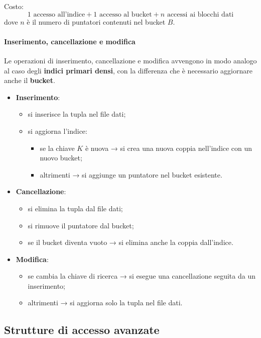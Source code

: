 Costo:
\[
1 \text{ accesso all'indice} + 1 \text{ accesso al bucket} + n \text{ accessi ai blocchi dati}
\]
dove $n$ è il numero di puntatori contenuti nel bucket $B$.

\paragraph{Inserimento, cancellazione e modifica}

Le operazioni di inserimento, cancellazione e modifica avvengono in modo analogo al caso degli \textbf{indici primari densi}, con la differenza che è necessario aggiornare anche il \textbf{bucket}.

\begin{itemize}
	\item \textbf{Inserimento}:
	\begin{itemize}
		\item si inserisce la tupla nel file dati;
		\item si aggiorna l'indice:
		\begin{itemize}
			\item se la chiave $K$ è nuova → si crea una nuova coppia nell'indice con un nuovo bucket;
			\item altrimenti → si aggiunge un puntatore nel bucket esistente.
		\end{itemize}
	\end{itemize}
	
	\item \textbf{Cancellazione}:
	\begin{itemize}
		\item si elimina la tupla dal file dati;
		\item si rimuove il puntatore dal bucket;
		\item se il bucket diventa vuoto → si elimina anche la coppia dall'indice.
	\end{itemize}
	
	\item \textbf{Modifica}:
	\begin{itemize}
		\item se cambia la chiave di ricerca → si esegue una cancellazione seguita da un inserimento;
		\item altrimenti → si aggiorna solo la tupla nel file dati.
	\end{itemize}
\end{itemize}
\subsection{Strutture di accesso avanzate}

